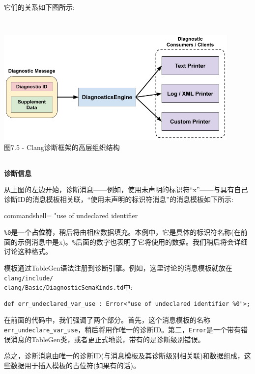 它们的关系如下图所示:

\hspace*{\fill} \\ %
\begin{center}
\includegraphics[width=0.9\textwidth]{content/2/chapter7/images/5.png}\\
图7.5 - Clang诊断框架的高层组织结构
\end{center}

\hspace*{\fill} \\ %
\noindent
\textbf{诊断信息}

从上图的左边开始，诊断消息——例如，使用未声明的标识符“x”——与具有自己诊断ID的消息模板相关联，“使用未声明的标识符消息”的消息模板如下所示:

\begin{tcblisting}{commandshell={}}
"use of undeclared identifier %
\end{tcblisting}

\texttt{\%0}是一个\textbf{占位符}，稍后将由相应数据填充。本例中，它是具体的标识符名称(在前面的示例消息中是x)。\texttt{\%}后面的数字也表明了它将使用的数据。我们稍后将会详细讨论这种格式。

模板通过TableGen语法注册到诊断引擎。例如，这里讨论的消息模板就放在\texttt{clang/include/\\clang/Basic/DiagnosticSemaKinds.td}中:

\begin{lstlisting}[style=stylePython]
def err_undeclared_var_use : Error<"use of undeclared identifier %0">;
\end{lstlisting}

在前面的代码中，我们强调了两个部分。首先，这个消息模板的名称\texttt{err\_undeclare\_var\_use}，稍后将用作唯一的诊断ID。第二，\texttt{Error}是一个带有错误消息的TableGen类，或者更正式地说，带有的是诊断级别错误。

总之，诊断消息由唯一的诊断ID(与消息模板及其诊断级别相关联)和数据组成，这些数据用于插入模板的占位符(如果有的话)。

